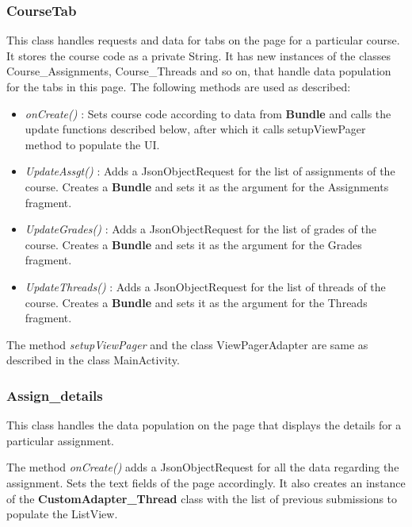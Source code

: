 \documentclass{article}
\begin{document}
\subsubsection{CourseTab}
\par\noindent This class handles requests and data for tabs on the page for a particular course. It stores the course code as a private String. It has new instances of the classes Course\_Assignments, Course\_Threads and so on, that handle data population for the tabs in this page. The following methods are used as described:
\begin{itemize}
\item \textit{onCreate()} : Sets course code according to data from \textbf{Bundle} and calls the update functions described below, after which it calls setupViewPager method to populate the UI.
\item \textit{UpdateAssgt()} : Adds a JsonObjectRequest for the list of assignments of the course. Creates a \textbf{Bundle} and sets it as the argument for the Assignments fragment.
\item \textit{UpdateGrades()} : Adds a JsonObjectRequest for the list of grades of the course. Creates a \textbf{Bundle} and sets it as the argument for the Grades fragment.
\item \textit{UpdateThreads()} : Adds a JsonObjectRequest for the list of threads of the course. Creates a \textbf{Bundle} and sets it as the argument for the Threads fragment.
\end{itemize}
\par\noindent The method \textit{setupViewPager} and the class ViewPagerAdapter are same as described in the class MainActivity.

\subsubsection{Assign\_details}
\par\noindent This class handles the data population on the page that displays the details for a particular assignment.
\par\noindent The method \textit{onCreate()} adds a JsonObjectRequest for all the data regarding the assignment. Sets the text fields of the page accordingly. It also creates an instance of the \textbf{CustomAdapter\_Thread} class with the list of previous submissions to populate the ListView.
\end{document}
